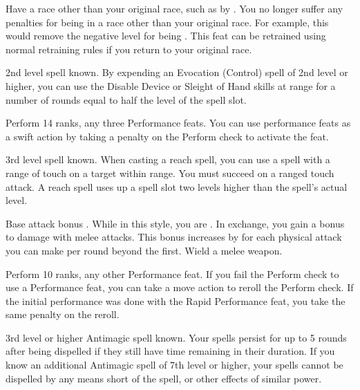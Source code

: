 \label{Racial Acclimation}
\featpre Have a race other than your original race, such as by .
\featben You no longer suffer any penalties for being in a race other than your original race.
For example, this would remove the negative level for being .
This feat can be retrained using normal retraining rules if you return to your original race.

\featpre 2nd level spell known.
\featben By expending an Evocation (Control) spell of 2nd level or higher, you can use the Disable Device or Sleight of Hand skills at \rngclose range for a number of rounds equal to half the level of the spell slot.

\featpres Perform 14 ranks, any three Performance feats.
\featben You can use performance feats as a swift action by taking a  penalty on the Perform check to activate the feat.

\featpre 3rd level spell known.
\featben When casting a reach spell, you can use a spell with a range of touch on a target within \rngclose range.
You must succeed on a ranged touch attack.
A reach spell uses up a spell slot two levels higher than the spell's actual level.

\featpre Base attack bonus .
\featben While in this style, you are .
In exchange, you gain a  bonus to damage with melee attacks.
This bonus increases by  for each physical attack you can make per round beyond the first.
\stylereq Wield a melee weapon.

\featpres Perform 10 ranks, any other Performance feat.
\featben If you fail the Perform check to use a Performance feat, you can take a move action to reroll the Perform check.
If the initial performance was done with the Rapid Performance feat, you take the same  penalty on the reroll.

\featpre 3rd level or higher Antimagic spell known.
\featben Your spells persist for up to 5 rounds after being dispelled if they still have time remaining in their duration.
If you know an additional Antimagic spell of 7th level or higher, your spells cannot be dispelled by any means short of the  spell, or other effects of similar power.

